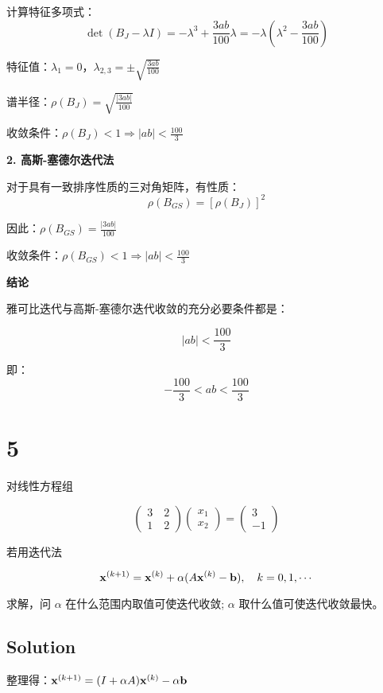 \documentclass[11pt]{article}
\begin{document}
计算特征多项式：
\[\det(B_J - \lambda I) = -\lambda^3 + \frac{3ab}{100}\lambda = -\lambda(\lambda^2 - \frac{3ab}{100})\]

特征值：\(\lambda_1 = 0\)，\(\lambda_{2,3} = \pm\sqrt{\frac{3ab}{100}}\)

谱半径：\(\rho(B_J) = \sqrt{\frac{|3ab|}{100}}\)

收敛条件：\(\rho(B_J) < 1 \Rightarrow |ab| < \frac{100}{3}\)

\textbf{2. 高斯-塞德尔迭代法}

对于具有一致排序性质的三对角矩阵，有性质：
\[\rho(B_{GS}) = [\rho(B_J)]^2\]

因此：\(\rho(B_{GS}) = \frac{|3ab|}{100}\)

收敛条件：\(\rho(B_{GS}) < 1 \Rightarrow |ab| < \frac{100}{3}\)

\textbf{结论}

雅可比迭代与高斯-塞德尔迭代收敛的充分必要条件都是：

\[|ab| < \frac{100}{3}\]

即：\[-\frac{100}{3} < ab < \frac{100}{3}\]

    \section{5}\label{section}

对线性方程组

\[
\begin{pmatrix}
3 \quad 2 \\
1 \quad 2
\end{pmatrix}
\begin{pmatrix}
x_1 \\
x_2
\end{pmatrix}
=\begin{pmatrix}
3 \\
-1
\end{pmatrix}
\]

若用迭代法

\[
\bold{x}^{(k + 1)} = \bold{x}^{(k)} + \alpha (A\bold{x}^{(k)} - \bold{b}), \quad k = 0, 1, \cdots
\]

求解，问 \(\alpha\) 在什么范围内取值可使迭代收敛; \(\alpha\)
取什么值可使迭代收敛最快。

    \subsection{Solution}\label{solution}

整理得：\(\bold{x}^{(k + 1)} = (I + \alpha A)\bold{x}^{(k)} - \alpha \bold{b}\)
\end{document}
